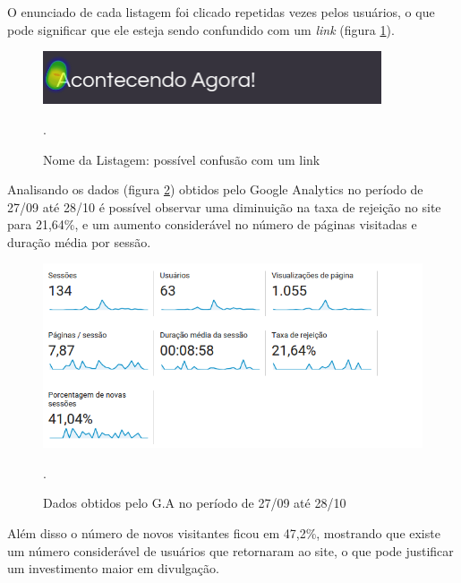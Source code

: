 \par O enunciado de cada listagem foi clicado repetidas vezes pelos usuários, o que pode significar que ele esteja sendo confundido com um \emph{link} (figura \ref{fig:heatmap_missclick}).
\begin{figure}[htb]
\centering
\includegraphics[width=10cm]{figuras/heatmap_missclick}
\caption{\label{fig:heatmap_missclick} Nome da Listagem: possível confusão com um link}.
\end{figure}
\par Analisando os dados (figura \ref{fig:analytics_3ainteracao_dados}) obtidos pelo Google Analytics no período de 27/09 até 28/10 é possível observar uma diminuição na taxa de rejeição no site para 21,64\%, e um aumento considerável no número de páginas visitadas e duração média por sessão.
\begin{figure}[htb]
\centering
\includegraphics[width=15cm]{figuras/analytics_3ainteracao_dados}
\caption{\label{fig:analytics_3ainteracao_dados} Dados obtidos pelo G.A no período de 27/09 até 28/10 }.
\end{figure}

\par Além disso o número de novos visitantes ficou em 47,2\%, mostrando que existe
um número considerável de usuários que retornaram ao site, o que pode justificar um
investimento maior em divulgação.
